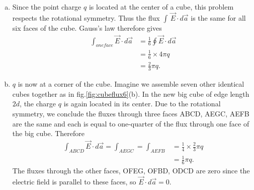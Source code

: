 \documentclass{esg8022pset}
\begin{document}
\begin{solution}
\begin{enumerate}[(a)]
    \item Since the point charge $q$ is located at the center of a cube,
          this problem respects the rotational symmetry.  Thus the flux
          $\int\,\vec{E}\cdot d\vec{a}$ is the same for all six faces of the
          cube.  Gauss's law therefore gives
          \begin{align*}
            \int_{one face} \vec{E}\cdot d\vec{a} & = \frac{1}{6}\oint \vec{E}\cdot d\vec{a}\\
                                                  & = \frac{1}{6}\times 4\pi q\\
                                                  & = \frac{2}{3}\pi q.
          \end{align*}
    \item $q$ is now at a corner of the cube.  Imagine we assemble seven
          other identical cubes together as in fig.\ref{fig:cubeflux6}(b).  In
          the new big cube of edge length $2d$, the charge $q$ is again located
          in its center.  Due to the rotational symmetry, we conclude the fluxes
          through three faces ABCD, AEGC, AEFB are the same and each is equal to
          one-quarter of the flux through one face of the big cube.  Therefore
          \begin{align*}
            \int_{ABCD} \vec{E}\cdot d\vec{a}=\int_{AEGC}=\int_{AEFB} & = \frac{1}{4}\times\frac{2}{3}\pi q\\
              & = \frac{1}{6}\pi q.
          \end{align*}
          The fluxes through the other faces, OFEG, OFBD, ODCD are zero since the
          electric field is parallel to these faces, so $\vec{E}\cdot d\vec{a}=0$.
  \end{enumerate}
\end{solution}
\end{document}
